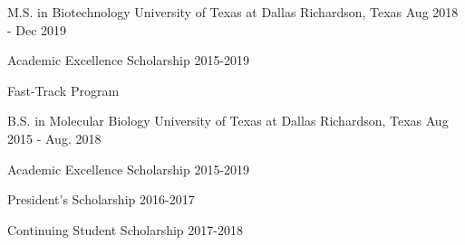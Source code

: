 

\begin{cventries}

	\cventry
	{M.S. in Biotechnology} %
	{University of Texas at Dallas} %
	{Richardson, Texas} %
	{Aug 2018 - Dec 2019} %
	{
		\begin{cvitems} %
			\item {Academic Excellence Scholarship 2015-2019}
			\item {Fast-Track Program}
		\end{cvitems}
	}

	\cventry
	{B.S. in Molecular Biology} %
	{University of Texas at Dallas} %
	{Richardson, Texas} %
	{Aug 2015 - Aug. 2018} %
	{
		\begin{cvitems} %
			\item {Academic Excellence Scholarship 2015-2019}
			\item {President's Scholarship 2016-2017}
			\item {Continuing Student Scholarship 2017-2018}
		\end{cvitems}
	}

\end{cventries}
